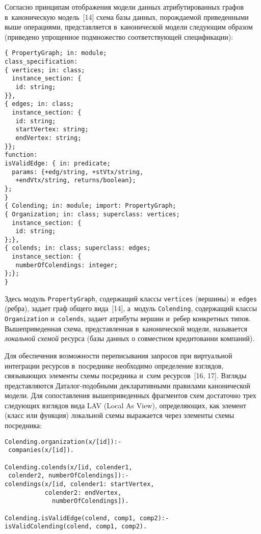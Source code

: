 \begin{multicols}{2}
      Согласно принципам отображения модели данных атрибутированных 
графов в~каноническую модель~[14] схема базы данных, порождаемой 
приведенными выше операциями, представляется в~канониче\-ской модели 
сле\-ду\-ющим образом (приведено упрощенное подмножество соответст\-ву\-ющей 
спецификации):
      {\small\begin{verbatim}
{ PropertyGraph; in: module;
class_specification: 
{ vertices; in: class; 
  instance_section: {
   id: string;
}},
{ edges; in: class;
  instance_section: {
   id: string;
   startVertex: string;
   endVertex: string;
}};
function:
isValidEdge: { in: predicate; 
  params: {+edg/string, +stVtx/string,
   +endVtx/string, returns/boolean};
}; 
}
{ Colending; in: module; import: PropertyGraph;
{ Organization; in: class; superclass: vertices;
  instance_section: {
   id: string;
};},
{ colends; in: class; superclass: edges;
  instance_section: {
   numberOfColendings: integer;
};};
}
\end{verbatim}
}

     \noindent
      Здесь модуль \verb"PropertyGraph", содержащий классы \verb"vertices" 
(вершины) и~\verb"edges" (ребра), задает граф общего вида~[14], а~модуль 
\verb"Colending", содержащий классы \verb"Organization" и~\verb"colends", 
задает атрибуты вершин и~ребер конкретных типов. Вышеприведенная схема, 
представленная в~канонической модели, называется \textit{локальной схемой} 
ресурса (базы данных о совместном кредитовании компаний).
      
      Для обеспечения возможности переписывания запросов при 
виртуальной интеграции ресурсов в~посреднике необходимо определение 
взглядов, связывающих элементы схемы посредника и~схем ресурсов~[16, 17]. 
Взгляды представляются Да\-та\-лог-по\-доб\-ны\-ми декларативными правилами 
канонической модели. Для сопоставления вышеприведенных фрагментов схем 
достаточно трех следующих взглядов вида LAV (Local As View), 
определяющих, как элемент (класс или функция) локальной схемы выражается 
через элементы схемы посредника:
      {\small\begin{verbatim}
Colending.organization(x/[id]):-
 companies(x/[id]).

Colending.colends(x/[id, colender1, 
 colender2, numberOfColendings]):-
colendings(x/[id, colender1: startVertex,
           colender2: endVertex,
             numberOfColendings]).

Colending.isValidEdge(colend, comp1, comp2):-
isValidColending(colend, comp1, comp2).
\end{verbatim}
}


\end{multicols}
